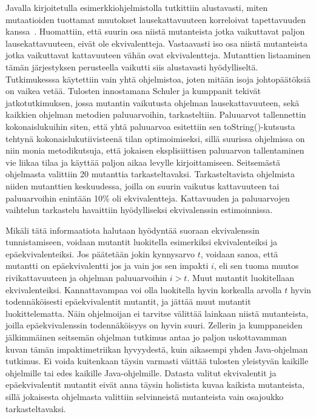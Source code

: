 \documentclass[finnish]{tktltiki2}
\begin{document}
Javalla kirjoitetulla esimerkkiohjelmistolla tutkittiin alustavasti, miten mutaatioiden tuottamat muutokset lausekattavuuteen korreloivat tapettavuuden kanssa~\cite{GrunSZ09}. Huomattiin, että suurin osa niistä mutanteista jotka vaikuttavat paljon lausekattavuuteen, eivät ole ekvivalentteja. Vastaavasti iso osa niistä mutanteista jotka vaikuttavat kattavuuteen vähän ovat ekvivalentteja. Mutanttien listaaminen tämän järjestyksen perusteella vaikutti siis alustavasti hyödylliseltä. Tutkimukesssa käytettiin vain yhtä ohjelmistoa, joten mitään isoja johtopäätöksiä on vaikea vetää. Tulosten innostamana Schuler ja kumppanit tekivät jatkotutkimuksen, jossa mutantin vaikutusta ohjelman lausekattavuuteen, sekä kaikkien ohjelman metodien paluuarvoihin, tarkasteltiin. Paluuarvot tallennettin kokonaislukuihin siten, että yhtä paluuarvoa esitettiin sen toString()-kutsusta tehtynä kokonaislukutiivisteenä tilan optimoimiseksi, sillä suurissa ohjelmissa on niin monia metodikutsuja, että jokaisen eksplisiittisen paluuarvon tallentaminen vie liikaa tilaa ja käyttää paljon aikaa levylle kirjoittamiseen. Seitsemästä ohjelmasta valittiin 20 mutanttia tarkasteltavaksi. Tarkasteltavista ohjelmista niiden mutanttien keskuudessa, joilla on suurin vaikutus kattavuuteen tai paluuarvoihin enintään 10\% oli ekvivalentteja. Kattavuuden ja paluuarvojen vaihtelun tarkastelu havaittiin hyödylliseksi ekvivalenssin estimoinnissa.

Mikäli tätä informaatiota halutaan hyödyntää suoraan ekvivalenssin tunnistamiseen, voidaan mutantit luokitella esimerkiksi ekvivalenteiksi ja epäekvivalenteiksi. Jos päätetään jokin kynnysarvo $t$, voidaan sanoa, että mutantti on epäekvivalentti jos ja vain jos sen impakti $i$, eli sen tuoma muutos rivikattavuuteen ja ohjelman paluuarvoihin $i > t$. Muut mutantit luokitellaan ekvivalenteiksi. Kannattavampaa voi olla luokitella hyvin korkealla arvolla $t$ hyvin todennäköisesti epäekvivalentit mutantit, ja jättää muut mutantit luokittelematta. Näin ohjelmoijan ei tarvitse välittää lainkaan niistä mutanteista, joilla epäekvivalenssin todennäköisyys on hyvin suuri. Zellerin ja kumppaneiden jälkimmäinen seitsemän ohjelman tutkimus antaa jo paljon uskottavamman kuvan tämän impaktimetriikan hyvyydestä, kuin aikasempi yhden Java-ohjelman tutkimus. Ei voida kuitenkaan täysin varmasti väittää tulosten yleistyvän kaikille ohjelmille tai edes kaikille Java-ohjelmille. Datasta valitut ekvivalentit ja epäekvivalentit mutantit eivät anna täysin holistista kuvaa kaikista mutanteista, sillä jokaisesta ohjelmasta valittiin selvinneistä mutanteista vain osajoukko tarkasteltavaksi.
\end{document}

